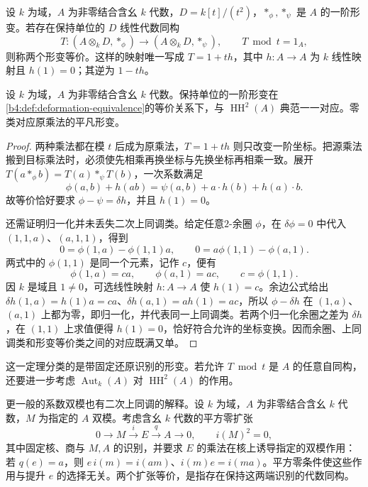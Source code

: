 \begin{definition}\label{b4:def:deformation-equivalence}
	设 \(k\) 为域，\(A\) 为非零结合含幺 \(k\) 代数，\(D=k[t]/(t^2)\)，\(*_\phi,*_\psi\) 是 \(A\) 的一阶形变。若存在保持单位的 \(D\) 线性代数同构
	\[
		T:(A\otimes_kD,*_\phi)\longrightarrow(A\otimes_kD,*_\psi), \qquad T\bmod t=1_A,
	\]
	则称两个形变等价。这样的映射唯一写成 \(T=1+t h\)，其中 \(h:A\to A\) 为 \(k\) 线性映射且 \(h(1)=0\)；其逆为 \(1-th\)。
\end{definition}

\begin{theorem}\label{b4:thm:hh2-deformation-classification}
	设 \(k\) 为域，\(A\) 为非零结合含幺 \(k\) 代数。保持单位的一阶形变在\cref{b4:def:deformation-equivalence}的等价关系下，与 \(\operatorname{HH}^2(A)\) 典范一一对应。零类对应原乘法的平凡形变。
\end{theorem}
\begin{proof}
	两种乘法都在模 \(t\) 后成为原乘法，\(T=1+th\) 则只改变一阶坐标。把源乘法搬到目标乘法时，必须使先相乘再换坐标与先换坐标再相乘一致。展开 \(T(a*_\phi b)=T(a)*_\psi T(b)\)，一次系数满足
	\[
		\phi(a,b)+h(ab)=\psi(a,b)+a\cdot h(b)+h(a)\cdot b.
	\]
	故等价恰好要求 \(\phi-\psi=\delta h\)，并且 \(h(1)=0\)。

	还需证明归一化并未丢失二次上同调类。给定任意\(2\)-余圈 \(\phi\)，在 \(\delta\phi=0\) 中代入 \((1,1,a)\)、\((a,1,1)\)，得到
	\[
		0=\phi(1,a)-\phi(1,1)a,\qquad 0=a\phi(1,1)-\phi(a,1).
	\]
	两式中的 \(\phi(1,1)\) 是同一个元素，记作 \(c\)，便有
	\[
		\phi(1,a)=ca,\qquad \phi(a,1)=ac,\qquad c=\phi(1,1).
	\]
	因 \(k\) 是域且 \(1\ne0\)，可选线性映射 \(h:A\to A\) 使 \(h(1)=c\)。余边公式给出 \(\delta h(1,a)=h(1)a=ca\)、\(\delta h(a,1)=ah(1)=ac\)，所以 \(\phi-\delta h\) 在 \((1,a)\)、\((a,1)\) 上都为零，即归一化，并代表同一上同调类。若两个归一化余圈之差为 \(\delta h\)，在 \((1,1)\) 上求值便得 \(h(1)=0\)，恰好符合允许的坐标变换。因而余圈、上同调类和形变等价类之间的对应既满又单。
\end{proof}

这一定理分类的是带固定还原识别的形变。若允许 \(T\bmod t\) 是 \(A\) 的任意自同构，还要进一步考虑 \(\operatorname{Aut}_k(A)\) 对 \(\operatorname{HH}^2(A)\) 的作用。

\ProseParagraphBreak
更一般的系数双模也有二次上同调的解释。设 \(k\) 为域，\(A\) 为非零结合含幺 \(k\) 代数，\(M\) 为指定的 \(A\) 双模。考虑含幺 \(k\) 代数的平方零扩张
\[
	0\longrightarrow M\xrightarrow{i}E\xrightarrow{q}A\longrightarrow0, \qquad i(M)^2=0,
\]
其中固定核、商与 \(M,A\) 的识别，并要求 \(E\) 的乘法在核上诱导指定的双模作用：若 \(q(e)=a\)，则 \(e\,i(m)=i(am)\)、\(i(m)e=i(ma)\)。平方零条件使这些作用与提升 \(e\) 的选择无关。两个扩张等价，是指存在保持这两端识别的代数同构。

